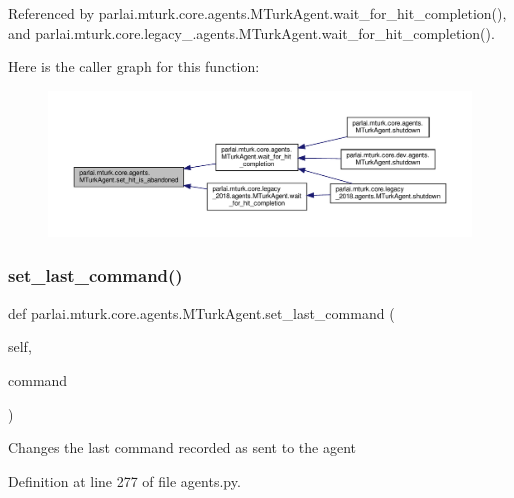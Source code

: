 Referenced by parlai.\+mturk.\+core.\+agents.\+M\+Turk\+Agent.\+wait\+\_\+for\+\_\+hit\+\_\+completion(), and parlai.\+mturk.\+core.\+legacy\+\_.\+agents.\+M\+Turk\+Agent.\+wait\+\_\+for\+\_\+hit\+\_\+completion().

Here is the caller graph for this function\+:
\nopagebreak
\begin{figure}[H]
\begin{center}
\leavevmode
\includegraphics[width=350pt]{classparlai_1_1mturk_1_1core_1_1agents_1_1MTurkAgent_a71115b83b70d4730c54e61837846d914_icgraph}
\end{center}
\end{figure}
\mbox{\label{classparlai_1_1mturk_1_1core_1_1agents_1_1MTurkAgent_a04a89ff05aa910e6ff8cc58e96d61b21}} 
\subsubsection{\texorpdfstring{set\+\_\+last\+\_\+command()}{set\_last\_command()}}
{\footnotesize\ttfamily def parlai.\+mturk.\+core.\+agents.\+M\+Turk\+Agent.\+set\+\_\+last\+\_\+command (\begin{DoxyParamCaption}\item[{}]{self,  }\item[{}]{command }\end{DoxyParamCaption})}

\begin{DoxyVerb}Changes the last command recorded as sent to the agent\end{DoxyVerb}
 

Definition at line 277 of file agents.\+py.



